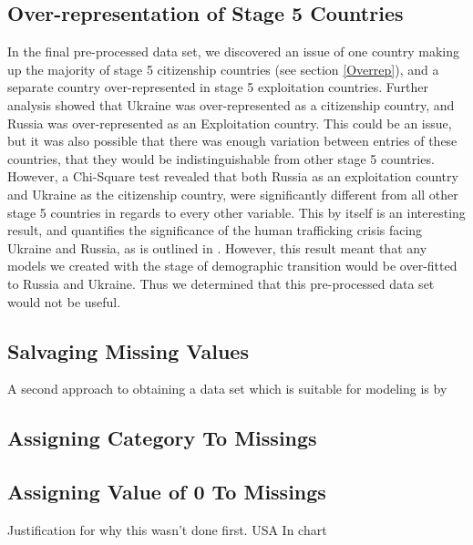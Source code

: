 \documentclass{article} %
\begin{document}
	\subsection{Over-representation of Stage 5 Countries}
	
	In the final pre-processed data set, we discovered an issue of one country making up the majority of stage 5 citizenship countries (see section \ref{Overrep}), and a separate country over-represented in stage 5 exploitation countries. Further analysis showed that Ukraine was over-represented as a citizenship country, and Russia was over-represented as an Exploitation country. This could be an issue, but it was also possible that there was enough variation between entries of these countries, that they would be indistinguishable from other stage 5 countries. However, a Chi-Square test revealed that both Russia as an exploitation country and Ukraine as the citizenship country, were significantly different from all other stage 5 countries in regards to every other variable. This by itself is an interesting result, and quantifies the significance of the human trafficking crisis facing Ukraine and Russia, as is outlined in \cite{RussiaTrafficking}. However, this result meant that any models we created with the stage of demographic transition would be over-fitted to Russia and Ukraine. Thus we determined that this pre-processed data set would not be useful.
	
	\subsection{Salvaging Missing Values}
	
	A second approach to obtaining a data set which is suitable for modeling is by 
	
	\subsection{Assigning Category To Missings}
	
	\subsection{Assigning Value of 0 To Missings}
	
	Justification for why this wasn't done first. USA In chart
	
	
	
	
	
	
	
	
	
\end{document}
